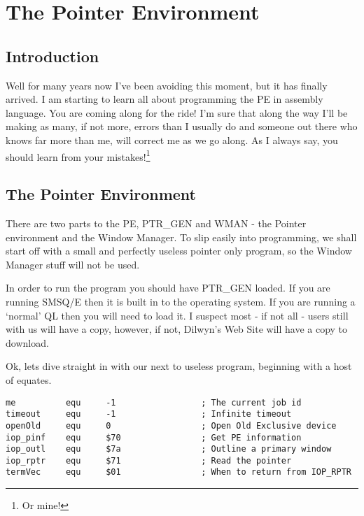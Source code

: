 \chapter{The Pointer Environment}

\section{Introduction}
\label{ch20-intro}%

Well for many years now I've been avoiding this moment, but it has finally arrived.
I am starting to learn all about programming the PE in assembly language. You are coming
along for the ride! I'm sure that along the way I'll be making as many, if not more,
errors than I usually do and someone out there who knows far more than me, will correct me
as we go along. As I always say, you should learn from your mistakes!\footnote{Or mine!} 

\section{The Pointer Environment}
\label{ch20-the-pe}%

There are two parts to the PE, PTR\_GEN and WMAN -{} the Pointer environment and the
Window Manager. To slip easily into programming, we shall start off with a small and
perfectly useless pointer only program, so the Window Manager stuff will not be
used.

In order to run the program you should have PTR\_GEN loaded. If you are running
SMSQ/E then it is built in to the operating system. If you are running a `normal' QL then
you will need to load it. I suspect most -{} if not all -{} users still with us will have a
copy, however, if not, Dilwyn's Web Site will have a copy to download.

Ok, lets dive straight in with our next to useless program, beginning with a host of
equates.

\begin{lstlisting}[firstnumber=1,caption={Simple PE Program - Part 1}]
me          equ     -1                 ; The current job id
timeout     equ     -1                 ; Infinite timeout
openOld     equ     0                  ; Open Old Exclusive device
iop_pinf    equ     $70                ; Get PE information
iop_outl    equ     $7a                ; Outline a primary window
iop_rptr    equ     $71                ; Read the pointer
termVec     equ     $01                ; When to return from IOP_RPTR
\end{lstlisting}

